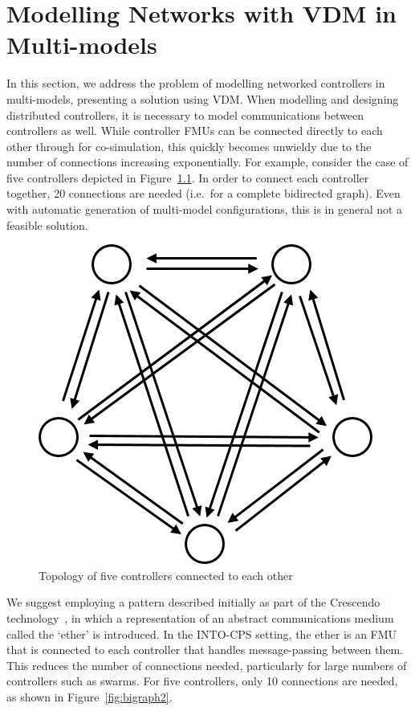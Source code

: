\chapter{Modelling Networks with VDM in Multi-models}
\label{sec:networks}

In this section, we address the problem of modelling networked controllers in multi-models, presenting a solution using VDM. When modelling and designing distributed controllers, it is necessary to model communications between controllers as well. While controller FMUs can be connected directly to each other through for co-simulation, this quickly becomes unwieldy due to the number of connections increasing exponentially. For example, consider the case of five controllers depicted in Figure~\ref{fig:bigraph}. In order to connect each controller together, 20 connections are needed (i.e.\ for a complete bidirected graph). Even with automatic generation of multi-model configurations, this is in general not a feasible solution.

\begin{figure}[hb]
\centering
\includegraphics[scale=0.4]{figures/bigraph}
\caption{Topology of five controllers connected to each other}
\label{fig:bigraph}
\end{figure}

We suggest employing a pattern described initially as part of the Crescendo technology~\cite{Fitzgerald&14c}, in which a representation of an abstract communications medium called the `ether' is introduced. In the INTO-CPS setting, the ether is an FMU that is connected to each controller that handles message-passing between them. This reduces the number of connections needed, particularly for large numbers of controllers such as swarms. For five controllers, only 10 connections are needed, as shown in Figure~\ref{fig:bigraph2}.

